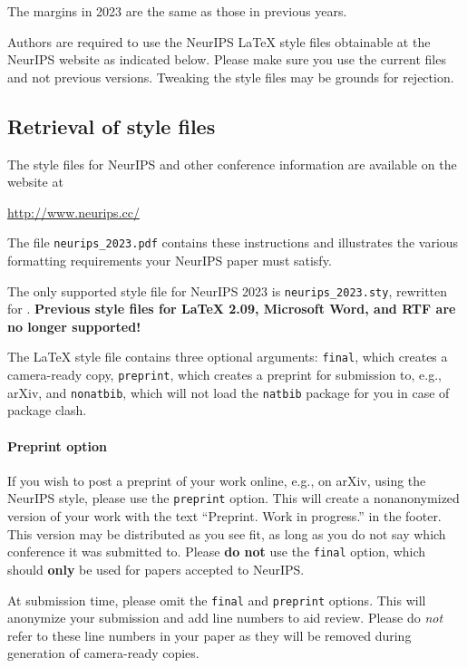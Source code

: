\documentclass{article}
\begin{document}
The margins in 2023 are the same as those in previous years.


Authors are required to use the NeurIPS \LaTeX{} style files obtainable at the
NeurIPS website as indicated below. Please make sure you use the current files
and not previous versions. Tweaking the style files may be grounds for
rejection.


\subsection{Retrieval of style files}


The style files for NeurIPS and other conference information are available on
the website at
\begin{center}
  \url{http://www.neurips.cc/}
\end{center}
The file \verb+neurips_2023.pdf+ contains these instructions and illustrates the
various formatting requirements your NeurIPS paper must satisfy.


The only supported style file for NeurIPS 2023 is \verb+neurips_2023.sty+,
rewritten for \LaTeXe{}.  \textbf{Previous style files for \LaTeX{} 2.09,
  Microsoft Word, and RTF are no longer supported!}


The \LaTeX{} style file contains three optional arguments: \verb+final+, which
creates a camera-ready copy, \verb+preprint+, which creates a preprint for
submission to, e.g., arXiv, and \verb+nonatbib+, which will not load the
\verb+natbib+ package for you in case of package clash.


\paragraph{Preprint option}
If you wish to post a preprint of your work online, e.g., on arXiv, using the
NeurIPS style, please use the \verb+preprint+ option. This will create a
nonanonymized version of your work with the text ``Preprint. Work in progress.''
in the footer. This version may be distributed as you see fit, as long as you do not say which conference it was submitted to. Please \textbf{do
  not} use the \verb+final+ option, which should \textbf{only} be used for
papers accepted to NeurIPS. 


At submission time, please omit the \verb+final+ and \verb+preprint+
options. This will anonymize your submission and add line numbers to aid
review. Please do \emph{not} refer to these line numbers in your paper as they
will be removed during generation of camera-ready copies.
\end{document}
